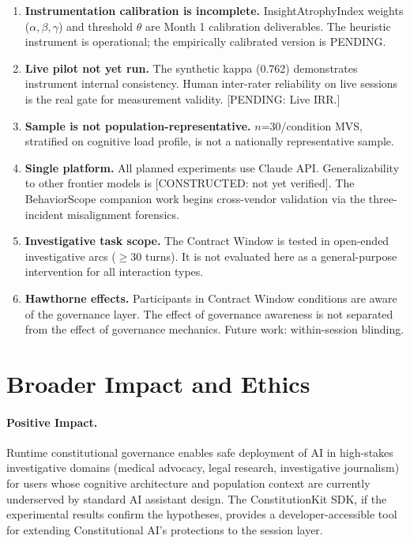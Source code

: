 \documentclass{article}
\newcommand{\cw}{Contract Window\xspace}
\newcommand{\iai}{InsightAtrophyIndex\xspace}
\newcommand{\cai}{Constitutional AI\xspace}
\newcommand{\pending}[1]{\textcolor{pendingred}{[PENDING: #1]}}
\newcommand{\constructed}[1]{\textcolor{pendingred}{[CONSTRUCTED: #1]}}
\begin{document}
\begin{enumerate}
\item \textbf{Instrumentation calibration is incomplete.} \iai{} weights
($\alpha, \beta, \gamma$) and threshold $\theta$ are Month 1 calibration
deliverables. The heuristic instrument is operational; the empirically
calibrated version is PENDING.

\item \textbf{Live pilot not yet run.} The synthetic kappa (0.762) demonstrates
instrument internal consistency. Human inter-rater reliability on live sessions
is the real gate for measurement validity. \pending{Live IRR.}

\item \textbf{Sample is not population-representative.} $n$=30/condition MVS,
stratified on cognitive load profile, is not a nationally representative sample.

\item \textbf{Single platform.} All planned experiments use Claude API.
Generalizability to other frontier models is \constructed{not yet verified}.
The BehaviorScope companion work begins cross-vendor validation via the
three-incident misalignment forensics.

\item \textbf{Investigative task scope.} The \cw{} is tested in open-ended
investigative arcs ($\geq$30 turns). It is not evaluated here as a
general-purpose intervention for all interaction types.

\item \textbf{Hawthorne effects.} Participants in \cw{} conditions are aware
of the governance layer. The effect of governance awareness is not separated
from the effect of governance mechanics. Future work: within-session blinding.
\end{enumerate}

\section{Broader Impact and Ethics}
\label{sec:ethics}

\paragraph{Positive Impact.}
Runtime constitutional governance enables safe deployment of AI in high-stakes
investigative domains (medical advocacy, legal research, investigative
journalism) for users whose cognitive architecture and population context are
currently underserved by standard AI assistant design. The ConstitutionKit SDK,
if the experimental results confirm the hypotheses, provides a
developer-accessible tool for extending \cai's protections to the session layer.
\end{document}
